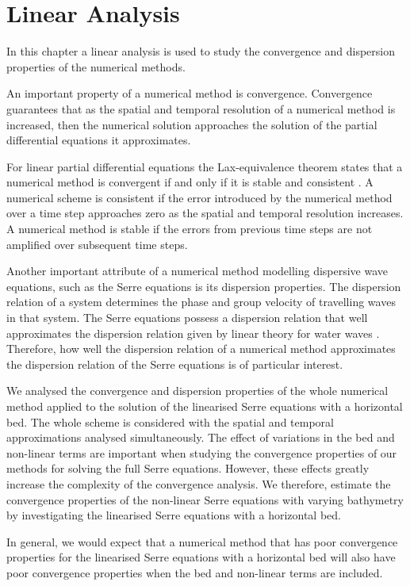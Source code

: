 \chapter{Linear Analysis}
\label{chp:AnalNumMethod}
In this chapter a linear analysis is used to study the convergence and dispersion properties of the numerical methods. 

An important property of a numerical method is convergence. Convergence guarantees that as the spatial and temporal resolution of a numerical method is increased, then the numerical solution approaches the solution of the partial differential equations it approximates. 

For linear partial differential equations the Lax-equivalence theorem states that a numerical method is convergent if and only if it is stable and consistent \cite{Lax-Richtmyer-1956-267}. A numerical scheme is consistent if the error introduced by the numerical method over a time step approaches zero as the spatial and temporal resolution increases. A numerical method is stable if the errors from previous time steps are not amplified over subsequent time steps.

Another important attribute of a numerical method modelling dispersive wave equations, such as the Serre equations is its dispersion properties. The dispersion relation of a system determines the phase and group velocity of travelling waves in that system. The Serre equations possess a dispersion relation that well approximates the dispersion relation given by linear theory for water waves \cite{Barthelemy-2004-315}. Therefore, how well the dispersion relation of a numerical method approximates the dispersion relation of the Serre equations is of particular interest.

We analysed the convergence and dispersion properties of the whole numerical method applied to the solution of the linearised Serre equations with a horizontal bed. The whole scheme is considered with the spatial and temporal approximations analysed simultaneously. The effect of variations in the bed and non-linear terms are important when studying the convergence properties of our methods for solving the full Serre equations. However, these effects greatly increase the complexity of the convergence analysis. We therefore, estimate the convergence properties of the non-linear Serre equations with varying bathymetry by investigating the linearised Serre equations with a horizontal bed. 

In general, we would expect that a numerical method that has poor convergence properties for the linearised Serre equations with a horizontal bed will also have poor convergence properties when the bed and non-linear terms are included. 


